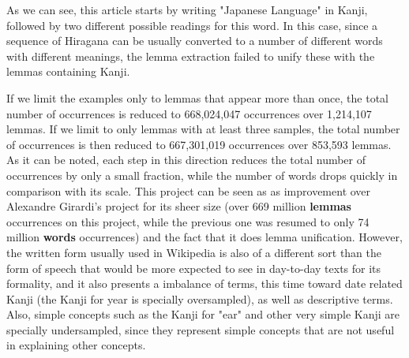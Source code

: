 \begin{center}
\end{center}

As we can see, this article starts by writing "Japanese Language" in Kanji, followed by two different possible readings for this word. In this case, since a sequence of Hiragana can be usually converted to a number of different words with different meanings, the lemma extraction failed to unify these with the lemmas containing Kanji.

If we limit the examples only to lemmas that appear more than once, the total number of occurrences is reduced to 668,024,047 occurrences over 1,214,107 lemmas. If we limit to only lemmas with at least three samples, the total number of occurrences is then reduced to 667,301,019 occurrences over 853,593 lemmas. As it can be noted, each step in this direction reduces the total number of occurrences by only a small fraction, while the number of words drops quickly in comparison with its scale. This project can be seen as as improvement over Alexandre Girardi's project for its sheer size (over 669 million \textbf{lemmas} occurrences on this project, while the previous one was resumed to only 74 million \textbf{words} occurrences) and the fact that it does lemma unification. However, the written form usually used in Wikipedia is also of a different sort than the form of speech that would be more expected to see in day-to-day texts for its formality, and it also presents a imbalance of terms, this time toward date related Kanji (the Kanji for year is specially oversampled), as well as descriptive terms. Also, simple concepts such as the Kanji for "ear" and other very simple Kanji are specially undersampled, since they represent simple concepts that are not useful in explaining other concepts.

